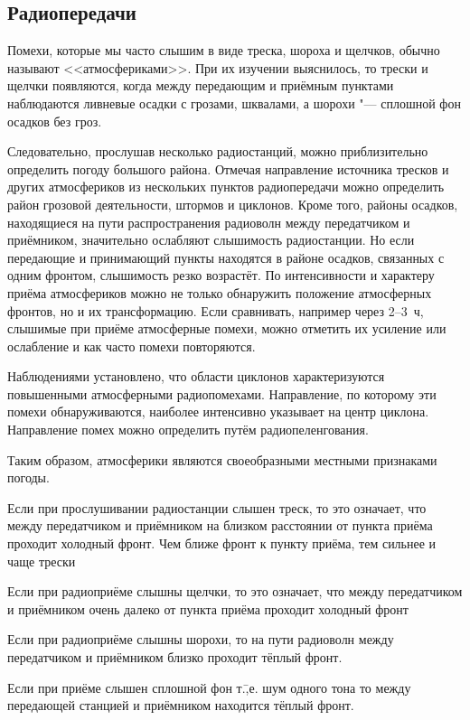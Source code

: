 \subsection{Радиопередачи}

Помехи, которые мы часто слышим в виде треска, шороха и щелчков,
обычно называют <<атмосфериками>>. При их изучении выяснилось, то трески
и щелчки появляются, когда между передающим и приёмным пунктами
наблюдаются ливневые осадки с грозами, шквалами, а шорохи "---
сплошной фон осадков без гроз.

Следовательно, прослушав несколько радиостанций, можно приблизительно
определить погоду большого района. Отмечая направление источника
тресков и других атмосфериков из нескольких пунктов радиопередачи
можно определить район грозовой деятельности, штормов и
циклонов. Кроме того, районы осадков, находящиеся на пути
распространения радиоволн между передатчиком и приёмником, значительно
ослабляют слышимость радиостанции. Но если передающие и принимающий
пункты находятся в районе осадков, связанных с одним фронтом,
слышимость резко возрастёт. По интенсивности и характеру приёма
атмосфериков можно не только обнаружить положение атмосферных фронтов,
но и их трансформацию. Если сравнивать, например через 2--3~ч,
слышимые при приёме атмосферные помехи, можно отметить их усиление или
ослабление и как часто помехи повторяются.

Наблюдениями установлено, что области циклонов характеризуются
повышенными атмосферными радиопомехами. Направление, по которому эти
помехи обнаруживаются, наиболее интенсивно указывает на центр
циклона. Направление помех можно определить путём радиопеленгования.

Таким образом, атмосферики являются своеобразными местными признаками
погоды.

 Если при прослушивании радиостанции слышен треск, то это
означает, что между передатчиком и приёмником на близком расстоянии от
пункта приёма проходит холодный фронт. Чем ближе фронт к пункту
приёма, тем сильнее и чаще трески

 Если при радиоприёме слышны щелчки, то это означает, что между
передатчиком и приёмником очень далеко от пункта приёма проходит
холодный фронт

 Если при радиоприёме слышны шорохи, то на пути радиоволн между
передатчиком и приёмником близко проходит тёплый фронт.

 Если при приёме слышен сплошной фон т.\=,е. шум одного тона то
между передающей станцией и приёмником находится тёплый фронт.

